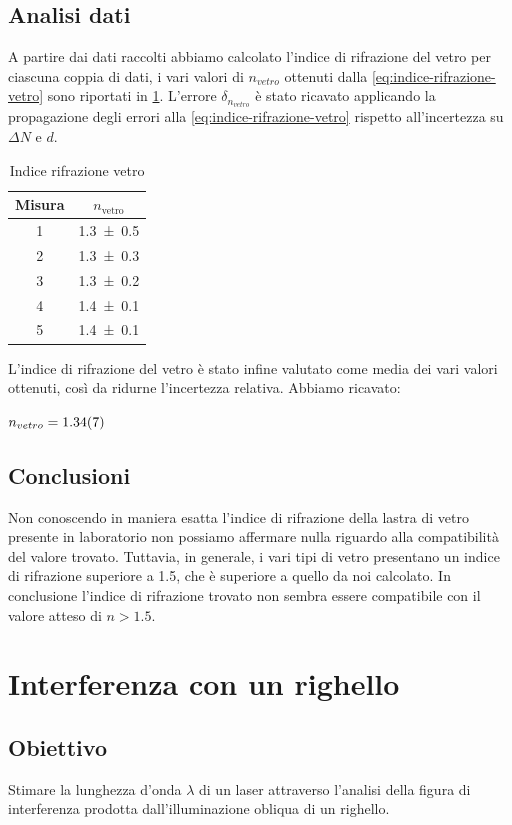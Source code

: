 \documentclass[a4paper]{article}
\begin{document}
\subsection{Analisi dati}
A partire dai dati raccolti abbiamo calcolato l'indice di rifrazione del vetro per ciascuna coppia di dati, i vari valori di $n_{vetro}$ ottenuti dalla \cref{eq:indice-rifrazione-vetro} sono riportati in \cref{tab:indice-rifrazione-vetro}. L'errore $\delta_{n_{vetro}}$ è stato ricavato applicando la propagazione degli errori alla \cref{eq:indice-rifrazione-vetro} rispetto all'incertezza su $\Delta N$ e $d$.
\begin{table}[htbp]
\centering
\caption{Indice rifrazione vetro}
\label{tab:indice-rifrazione-vetro}
\begin{tabular}{|c|c|}
\hline
\textbf{Misura} & \( n_{\text{vetro}} \) \\
\hline
1 & \num{1.3 \pm 0.5} \\
2 & \num{1.3 \pm 0.3} \\
3 & \num{1.3 \pm 0.2} \\
4 & \num{1.4 \pm 0.1} \\
5 & \num{1.4 \pm 0.1} \\
\hline
\end{tabular}
\end{table}
L'indice di rifrazione del vetro è stato infine valutato come media dei vari valori ottenuti, così da ridurne l'incertezza relativa. Abbiamo ricavato:
\begin{center}
    $n_{vetro}=\num{1.34 \pm 0.07}$
\end{center}
\subsection{Conclusioni}
Non conoscendo in maniera esatta l'indice di rifrazione della lastra di vetro presente in laboratorio non possiamo affermare nulla riguardo alla compatibilità del valore trovato. Tuttavia, in generale, i vari tipi di vetro presentano un indice di rifrazione superiore a \num{1.5}, che è superiore a quello da noi calcolato. In conclusione l'indice di rifrazione trovato non sembra essere compatibile con il valore atteso di $n>\num{1.5}$. 

\section{Interferenza con un righello}
\subsection{Obiettivo}
Stimare la lunghezza d'onda $\lambda$ di un laser attraverso l'analisi della figura di interferenza prodotta dall'illuminazione obliqua di un righello. 
\end{document}
